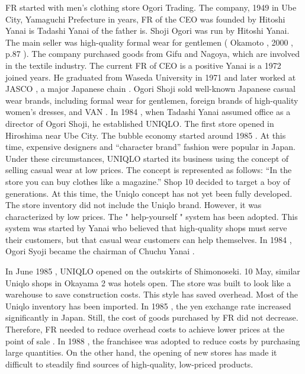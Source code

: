 \documentclass[]{article}
\begin{document}
FR started with men's clothing store Ogori Trading. The company, 1949 in
Ube City, Yamaguchi Prefecture in years, FR of the CEO was founded by
Hitoshi Yanai is Tadashi Yanai of the father is. Shoji Ogori was run by
Hitoshi Yanai. The main seller was high-quality formal wear for
gentlemen ( Okamoto , 2000 , p.87 ). The company purchased goods from
Gifu and Nagoya, which are involved in the textile industry. The current
FR of CEO is a positive Yanai is a 1972 joined years. He graduated from
Waseda University in 1971 and later worked at JASCO , a major Japanese
chain . Ogori Shoji sold well-known Japanese casual wear brands,
including formal wear for gentlemen, foreign brands of high-quality
women's dresses, and VAN . In 1984 , when Tadashi Yanai assumed office
as a director of Ogori Shoji, he established UNIQLO. The first store
opened in Hiroshima near Ube City. The bubble economy started around
1985 . At this time, expensive designers and ``character brand'' fashion
were popular in Japan. Under these circumstances, UNIQLO started its
business using the concept of selling casual wear at low prices. The
concept is represented as follows: ``In the store you can buy clothes
like a magazine.'' Shop 10 decided to target a boy of generations. At
this time, the Uniqlo concept has not yet been fully developed. The
store inventory did not include the Uniqlo brand. However, it was
characterized by low prices. The " help-yourself " system has been
adopted. This system was started by Yanai who believed that high-quality
shops must serve their customers, but that casual wear customers can
help themselves. In 1984 , Ogori Syoji became the chairman of Chuchu
Yanai .

In June 1985 , UNIQLO opened on the outskirts of Shimonoseki. 10 May,
similar Uniqlo shops in Okayama 2 was hotels open. The store was built
to look like a warehouse to save construction costs. This style has
saved overhead. Most of the Uniqlo inventory has been imported. In 1985
, the yen exchange rate increased significantly in Japan. Still, the
cost of goods purchased by FR did not decrease. Therefore, FR needed to
reduce overhead costs to achieve lower prices at the point of sale . In
1988 , the franchisee was adopted to reduce costs by purchasing large
quantities. On the other hand, the opening of new stores has made it
difficult to steadily find sources of high-quality, low-priced products.
\end{document}

